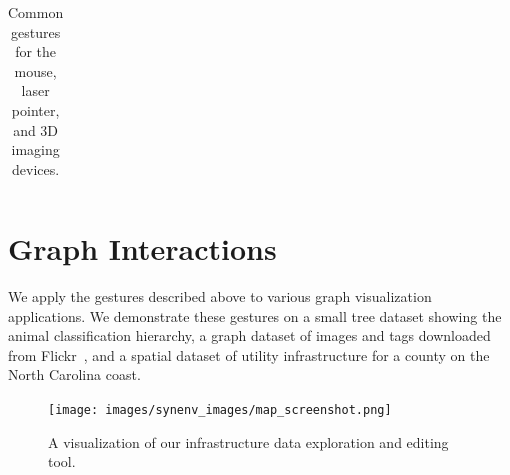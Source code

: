 \documentclass[runningheads,a4paper]{llncs}
\begin{document}
\begin{table}[t]
\begin{center}
\begin{tabular}{| l | l | l | l | l |}
 \end{tabular}
 \end{center}%
\vspace{-0.1in}
 \caption{
%
\label{table:gestures} 
%
Common gestures for the mouse, laser pointer, and 3D imaging
devices. 
%
%
%
\vspace{-0.1in}
}
\end{table}

\section{Graph Interactions}
\label{section:graph_interactions}


We apply the gestures described above 
to various
graph visualization applications.
We demonstrate these gestures on a small tree dataset showing the
animal classification hierarchy, a graph dataset of images and tags
downloaded from 
Flickr~\cite{MIRFLICKR}, and a
spatial dataset of utility infrastructure for a county on the North
Carolina coast.


\begin{figure}[t]
 \centering
 \texttt{[image: images/synenv\_images/map\_screenshot.png]}%
\vspace{-0.1in}
 \caption{\label{figure:edge_visualization}
A visualization of our infrastructure data exploration and editing tool.
\vspace{-0.1in}
}
\end{figure}

\vspace{-0.1in}
\end{document}
